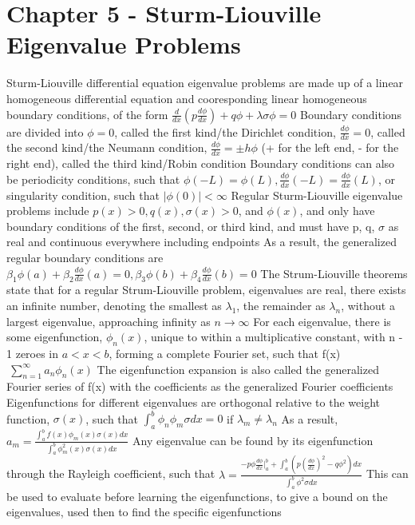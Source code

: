 \documentclass[11 pt, twoside]{article}
\newenvironment{outline*}
{
	\begin{outline}[enumerate]
	}
	{\end{outline}
}
\begin{document}
\section{Chapter 5 - Sturm-Liouville Eigenvalue Problems}
\begin{outline*}
\1 Sturm-Liouville differential equation eigenvalue problems are made up of a linear homogeneous differential equation and cooresponding linear homogeneous boundary conditions, of the form $\frac{d}{dx}(p\frac{d\phi}{dx}) + q\phi + \lambda \sigma \phi = 0$
	\2 Boundary conditions are divided into $\phi = 0$, called the first kind/the Dirichlet condition, $\frac{d\phi}{dx} = 0$, called the second kind/the Neumann condition, $\frac{d\phi}{dx} = \pm h\phi$ (+ for the left end, - for the right end), called the third kind/Robin condition
		\3 Boundary conditions can also be periodicity conditions, such that $\phi(-L) = \phi(L), \frac{d\phi}{dx}(-L) = \frac{d\phi}{dx}(L)$, or singularity condition, such that $|\phi(0)| < \infty$
		\3 Regular Sturm-Liouville eigenvalue problems include $p(x) > 0, q(x), \sigma(x) > 0$, and $\phi(x)$, and only have boundary conditions of the first, second, or third kind, and must have p, q, $\sigma$ as real and continuous everywhere including endpoints
	\2 As a result, the generalized regular boundary conditions are $\beta_1\phi(a) + \beta_2\frac{d\phi}{dx}(a) = 0, \beta_3\phi(b) + \beta_4\frac{d\phi}{dx}(b) = 0$
\1 The Strum-Liouville theorems state that for a regular Strum-Liouville problem, eigenvalues are real, there exists an infinite number, denoting the smallest as $\lambda_1$, the remainder as $\lambda_n$, without a largest eigenvalue, approaching infinity as $n \to \infty$
	\2 For each eigenvalue, there is some eigenfunction, $\phi_n(x)$, unique to within a multiplicative constant, with n - 1 zeroes in $a < x < b$, forming a complete Fourier set, such that f(x) $~ \sum^{\infty}_{n = 1}a_n\phi_n(x)$
		\3 The eigenfunction expansion is also called the generalized Fourier series of f(x) with the coefficients as the generalized Fourier coefficients
	\2 Eigenfunctions for different eigenvalues are orthogonal relative to the weight function, $\sigma(x)$, such that $\int^b_a \phi_n\phi_m\sigma dx = 0$ if $\lambda_m \neq \lambda_n$
		\3 As a result, $a_m = \frac{\int^b_a f(x)\phi_m(x)\sigma(x)dx}{\int^b_a \phi_m^2(x)\sigma(x)dx}$
	\2 Any eigenvalue can be found by its eigenfunction through the Rayleigh coefficient, such that $\lambda = \frac{-p\phi \frac{d\phi}{dx}|^b_a + \int^b_a (p(\frac{d\phi}{dx})^2 - q\phi^2)dx}{\int^b_a \phi^2 \sigma dx}$
		\3 This can be used to evaluate before learning the eigenfunctions, to give a bound on the eigenvalues, used then to find the specific eigenfunctions

\end{outline*}
\end{document}
